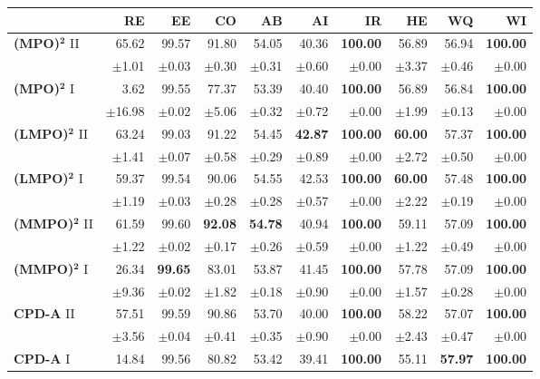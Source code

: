 \begin{table}[!htbp]
\centering
\scriptsize
\begin{tabular}{lrrrrr||rrrr}
\toprule
 & RE & EE & CO & AB & AI & IR & HE & WQ & WI \\
\midrule
\textbf{(MPO)}$\bm{^2}$ II & 65.62 & 99.57 & 91.80 & 54.05 & 40.36 & \textbf{100.00} & 56.89 & 56.94 & \textbf{100.00} \\
 & $\pm$1.01 & $\pm$0.03 & $\pm$0.30 & $\pm$0.31 & $\pm$0.60 & $\pm$0.00 & $\pm$3.37 & $\pm$0.46 & $\pm$0.00 \\
\midrule
\textbf{(MPO)}$\bm{^2}$ I & 3.62 & 99.55 & 77.37 & 53.39 & 40.40 & \textbf{100.00} & 56.89 & 56.84 & \textbf{100.00} \\
 & $\pm$16.98 & $\pm$0.02 & $\pm$5.06 & $\pm$0.32 & $\pm$0.72 & $\pm$0.00 & $\pm$1.99 & $\pm$0.13 & $\pm$0.00 \\
\midrule
\textbf{(LMPO)}$\bm{^2}$ II & 63.24 & 99.03 & 91.22 & 54.45 & \textbf{42.87} & \textbf{100.00} & \textbf{60.00} & 57.37 & \textbf{100.00} \\
 & $\pm$1.41 & $\pm$0.07 & $\pm$0.58 & $\pm$0.29 & $\pm$0.89 & $\pm$0.00 & $\pm$2.72 & $\pm$0.50 & $\pm$0.00 \\
\midrule
\textbf{(LMPO)}$\bm{^2}$ I & 59.37 & 99.54 & 90.06 & 54.55 & 42.53 & \textbf{100.00} & \textbf{60.00} & 57.48 & \textbf{100.00} \\
 & $\pm$1.19 & $\pm$0.03 & $\pm$0.28 & $\pm$0.28 & $\pm$0.57 & $\pm$0.00 & $\pm$2.22 & $\pm$0.19 & $\pm$0.00 \\
\midrule
\textbf{(MMPO)}$\bm{^2}$ II & 61.59 & 99.60 & \textbf{92.08} & \textbf{54.78} & 40.94 & \textbf{100.00} & 59.11 & 57.09 & \textbf{100.00} \\
 & $\pm$1.22 & $\pm$0.02 & $\pm$0.17 & $\pm$0.26 & $\pm$0.59 & $\pm$0.00 & $\pm$1.22 & $\pm$0.49 & $\pm$0.00 \\
\midrule
\textbf{(MMPO)}$\bm{^2}$ I & 26.34 & \textbf{99.65} & 83.01 & 53.87 & 41.45 & \textbf{100.00} & 57.78 & 57.09 & \textbf{100.00} \\
 & $\pm$9.36 & $\pm$0.02 & $\pm$1.82 & $\pm$0.18 & $\pm$0.90 & $\pm$0.00 & $\pm$1.57 & $\pm$0.28 & $\pm$0.00 \\
\midrule
\textbf{CPD-A} II & 57.51 & 99.59 & 90.86 & 53.70 & 40.00 & \textbf{100.00} & 58.22 & 57.07 & \textbf{100.00} \\
 & $\pm$3.56 & $\pm$0.04 & $\pm$0.41 & $\pm$0.35 & $\pm$0.90 & $\pm$0.00 & $\pm$2.43 & $\pm$0.47 & $\pm$0.00 \\
\midrule
\textbf{CPD-A} I & 14.84 & 99.56 & 80.82 & 53.42 & 39.41 & \textbf{100.00} & 55.11 & \textbf{57.97} & \textbf{100.00} \\

\end{tabular}
\end{table}
